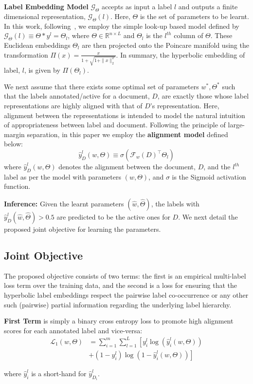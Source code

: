 \documentclass[11pt,a4paper]{article}
\def\R{\mathbb{R}}
\begin{document}
\textbf{Label Embedding Model} $\mathcal{G}_\Theta$ accepts as input a label $l$ and outputs  a finite dimensional representation, $\mathcal{G}_\Theta(l)$. Here, $\Theta$ is the set of parameters to be learnt. In this work, following~\citet{lorentz}, we employ the simple look-up based model defined by $\mathcal{G}_\Theta(l)\equiv \Theta*y^l=\Theta_l$, where $\Theta\in\R^{n\times L}$ and $\Theta_l$ is the $l^{th}$ column of $\Theta$. These Euclidean embeddings $\Theta_l$ are then projected onto the Poincare manifold using the transformation $\Pi(x) = \frac{x}{1+\sqrt{1+\|x\|_2^2}}$. In summary, the hyperbolic embedding of label, $l$, is given by $\Pi(\Theta_l)$.

We next assume that there exists some optimal set of parameters $w^*,\Theta^*$ such that the labels annotated/active for a document, $D$, are exactly those whose label representations are highly aligned with that of $D$'s representation. Here, alignment between the representations is intended to model the natural intuition of appropriateness between label and document. Following the principle of large-margin separation, in this paper we employ the \textbf{alignment model} defined below:
\begin{equation}
    \hat{y}_D^l\left(w,\Theta\right) \equiv \sigma\left(\mathcal{F}_w\left(D\right)^\top\Theta_l\right)
\end{equation}
where $\hat{y}_D^l\left(w,\Theta\right)$ denotes the alignment between the document, $D$, and the $l^{th}$ label as per the model with parameters $\left(w,\Theta\right)$, and $\sigma$ is the Sigmoid activation function.\par

\textbf{Inference:} Given the learnt parameters $(\hat{w},\hat{\Theta})$, the labels with $\hat{y}_D^l(\hat{w},\hat{\Theta})>0.5$ are predicted to be the active ones for $D$. We next detail the proposed joint objective for learning the parameters.

\subsection{Joint Objective \label{sec:jointObjective}}
The proposed objective consists of two terms: the first is an empirical multi-label loss term over the training data, and the second is a loss for ensuring that the hyperbolic label embeddings respect the pairwise label co-occurrence or any other such (pairwise) partial information regarding the underlying label hierarchy.

\textbf{First Term} is simply a binary cross entropy loss to promote high alignment scores for each annotated label and vice-versa:
\begin{align}\nonumber
    \mathcal{L}_1\left(w,\Theta\right) &= \sum_{i=1}^{m} \sum_{l=1}^L \left[y_i^l \log\left(\hat{y}_i^l\left(w,\Theta\right)\right)\right.\\
    &+ \left.(1-y_i^l)\log\left(1-\hat{y}_i^l\left(w,\Theta\right)\right)\right]
    \label{eq:comp1}
\end{align}\par
where $\hat{y}_i^l$ is a short-hand for $\hat{y}_{D_i}^l$.
\end{document}
